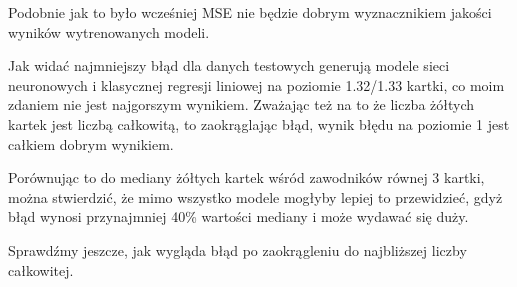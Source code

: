 \documentclass{article}
\begin{document}
Podobnie jak to było wcześniej MSE nie będzie dobrym wyznacznikiem jakości wyników wytrenowanych modeli.

Jak widać najmniejszy błąd dla danych testowych generują modele sieci neuronowych i klasycznej regresji liniowej na poziomie 1.32/1.33 kartki, co moim zdaniem nie jest najgorszym wynikiem. Zważając też na to że liczba żółtych kartek jest liczbą całkowitą, to zaokrąglając błąd, wynik błędu na poziomie 1 jest całkiem dobrym wynikiem.

Porównując to do mediany żółtych kartek wśród zawodników równej 3 kartki, można stwierdzić, że mimo wszystko modele mogłyby lepiej to przewidzieć, gdyż błąd wynosi przynajmniej 40\% wartości mediany i może wydawać się duży. 

\newpage
Sprawdźmy jeszcze, jak wygląda błąd po zaokrągleniu do najbliższej liczby całkowitej.
\end{document}
